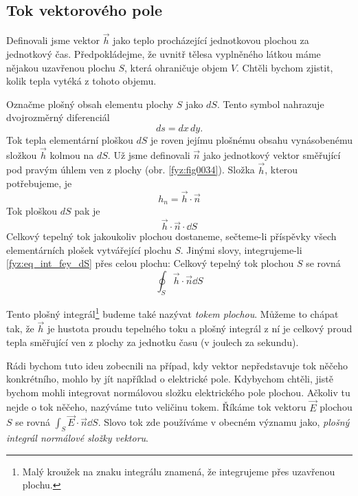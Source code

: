     \subsection{Tok vektorového pole}\label{fyz:IIchapIIIsecII}
      Definovali jsme vektor $\vec{h}$ jako teplo procházející jednotkovou plochou za jednotkový
      čas. Předpokládejme, že uvnitř tělesa vyplněného látkou máme nějakou uzavřenou plochu \(S\),
      která ohraničuje objem \(V\). Chtěli bychom zjistit, kolik tepla vytéká z tohoto objemu.
      
      Označme plošný obsah elementu plochy \(S\) jako \(dS\). Tento symbol nahrazuje dvojrozměrný
      diferenciál
      \begin{equation}
        ds=dx\,dy.
      \end{equation}
      Tok tepla elementární ploškou \(dS\) je roven jejímu plošnému obsahu  vynásobenému složkou 
      $\vec{h}$ kolmou na \(dS\). Už jsme definovali $\vec{n}$ jako jednotkový vektor směřující pod 
      pravým úhlem ven z plochy (obr. \ref{fyz:fig0034}). Složka $\vec{h}$, kterou potřebujeme, je
      \begin{equation}
        h_n = \vec{h}\cdot\vec{n}
      \end{equation}
      Tok ploškou $dS$ pak je
      \begin{equation}\label{fyz:eq_int_fey_dS}
        \vec{h}\cdot\vec{n}\cdot\dd{S}
      \end{equation}
      Celkový tepelný tok jakoukoliv plochou dostaneme, sečteme-li příspěvky všech elementárních 
      plošek vytvářející plochu \(S\). Jinými slovy, integrujeme-li \ref{fyz:eq_int_fey_dS} přes 
      celou plochu: Celkový tepelný tok plochou \(S\) se rovná
      \begin{equation}
        \oint_S\vec{h}\cdot\vec{n}\dd{S}
      \end{equation}
  
      Tento plošný integrál\footnote{Malý kroužek na znaku integrálu znamená, že integrujeme přes
      uzavřenou plochu.} budeme také nazývat \emph{tokem plochou}. Můžeme to chápat tak, že
      $\vec{h}$ je hustota proudu tepelného toku a plošný integrál z ní je celkový proud tepla
      směřující ven z plochy za jednotku času (v joulech za sekundu).
      
      Rádi bychom tuto ideu zobecnili na případ, kdy vektor nepředstavuje tok něčeho konkrétního,
      mohlo by jít například o elektrické pole. Kdybychom chtěli, jistě bychom mohli integrovat
      normálovou složku elektrického pole plochou. Ačkoliv tu nejde o tok něčeho, nazýváme tuto
      veličinu tokem. Říkáme tok vektoru $\vec{E}$ plochou \(S\) se rovná
      \(\int_S\vec{E}\cdot\vec{n}\dd{S}\). Slovo tok zde používáme v obecném významu jako,
      \emph{plošný integrál normálové složky vektoru}.  
      
